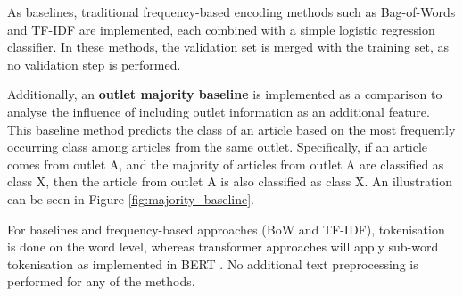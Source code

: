 As baselines, traditional frequency-based encoding methods such as Bag-of-Words and TF-IDF are implemented, each combined with a simple logistic regression classifier. In these methods, the validation set is merged with the training set, as no validation step is performed.

Additionally, an \textbf{outlet majority baseline} is implemented as a comparison to analyse the influence of including outlet information as an additional feature. This baseline method predicts the class of an article based on the most frequently occurring class among articles from the same outlet. Specifically, if an article comes from outlet A, and the majority of articles from outlet A are classified as class X, then the article from outlet A is also classified as class X. An illustration can be seen in Figure \ref{fig:majority_baseline}.

For baselines and frequency-based approaches (BoW and TF-IDF), tokenisation is done on the word level, whereas transformer approaches will apply sub-word tokenisation as implemented in BERT \cite{devlin-2019-bert}. No additional text preprocessing is performed for any of the methods.


